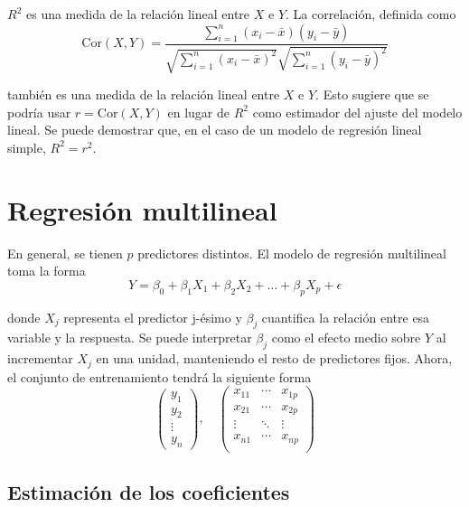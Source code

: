 \noindent $R^2$ es una medida de la relación lineal entre $X$ e $Y$. La correlación, definida como 
\begin{equation}
\text{Cor}(X, Y) = \frac{\sum_{i=1}^n (x_i - \bar{x})(y_i - \bar{y})}{\sqrt{\sum_{i=1}^n(x_i - \bar{x})^2}\sqrt{\sum_{i=1}^n (y_i - \bar{y})^2}} 
\end{equation}

\noindent también es una medida de la relación lineal entre $X$ e $Y$. Esto sugiere que se podría usar $r = \text{Cor}(X, Y)$ en lugar de $R^2$ como estimador del ajuste del modelo lineal. Se puede demostrar que, en el caso de un modelo de regresión lineal simple, $R^2 = r^2$. 

\section{Regresión multilineal}

En general, se tienen $p$ predictores distintos. El modelo de regresión multilineal toma la forma 
\begin{equation}
Y = \beta_0 + \beta_1 X_1 + \beta_2 X_2 + \dots + \beta_p X_p + \epsilon
\end{equation}

\noindent donde $X_j$ representa el predictor j-ésimo y $\beta_j$ cuantifica la relación entre esa variable y la respuesta. Se puede interpretar $\beta_j$ como el efecto medio sobre $Y$ al incrementar $X_j$ en una unidad, manteniendo el resto de predictores fijos. Ahora, el conjunto de entrenamiento tendrá la siguiente forma 
\begin{equation}
\begin{pmatrix}
y_1 \\
y_2 \\
\vdots \\
y_n
\end{pmatrix}, \quad 
\begin{pmatrix}
x_{11} & \cdots & x_{1p} \\
x_{21} & \cdots & x_{2p} \\
\vdots & \ddots & \vdots \\
x_{n1} & \cdots & x_{np} \\
\end{pmatrix}
\end{equation}

\subsection{Estimación de los coeficientes}

